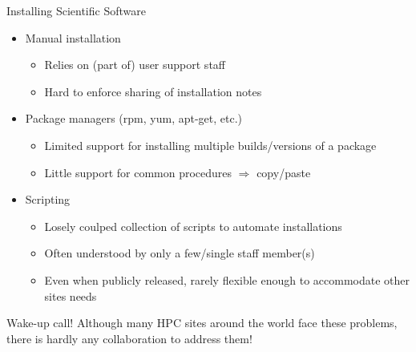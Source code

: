 \documentclass[10pt,xcolor={usenames,dvipsnames}]{beamer}
\begin{document}
\begin{frame}{Installing Scientific Software}
\begin{itemize}
    \item
        Manual installation
        \begin{itemize}
            \item
                Relies on (part of) user support staff
            \item
                Hard to enforce sharing of installation notes
        \end{itemize}
    \item
        Package managers (rpm, yum, apt-get, etc.)
        \begin{itemize}
            \item
                Limited support for installing multiple builds/versions of a
                package
            \item
                Little support for common procedures $\Rightarrow$ copy/paste
        \end{itemize}
    \item
        Scripting
        \begin{itemize}
            \item
                Losely coulped collection of scripts to automate installations
            \item
                Often understood by only a few/single staff member(s)
            \item
                Even when publicly released, rarely flexible enough to
                accommodate other sites needs
        \end{itemize}
\end{itemize}
\begin{center}
    \begin{minipage}{0.9\textwidth}
        \begin{alertblock}{Wake-up call!}
            \footnotesize
            Although many HPC sites around the world face these problems,
            there is hardly any collaboration to address them!
        \end{alertblock}
    \end{minipage}
\end{center}
\end{frame}

\end{document}
